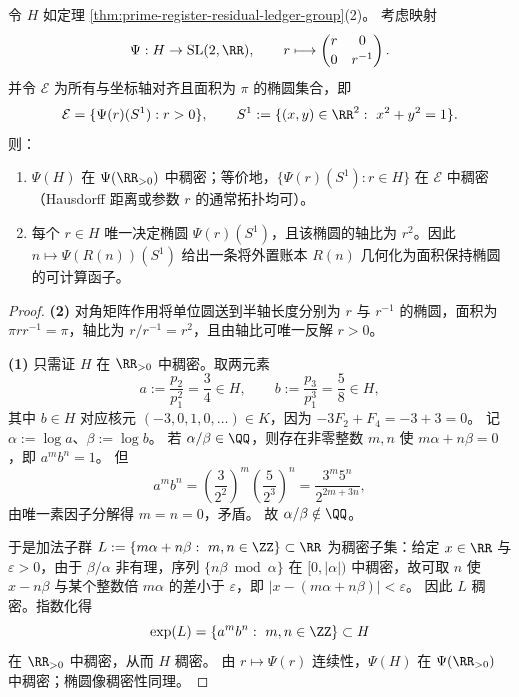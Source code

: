 \begin{theorem}[值保持算法群的稠密椭圆化]\label{thm:prime-register-dense-ellipticization}
令 \(H\) 如定理 \ref{thm:prime-register-residual-ledger-group}(2)。
考虑映射
\[
\Psi: H\to \mathrm{SL}(2,\RR),\qquad r\longmapsto
\begin{pmatrix}
r & 0\\[2pt]
0 & r^{-1}
\end{pmatrix}.
\]
并令 \(\mathcal E\) 为所有与坐标轴对齐且面积为 \(\pi\) 的椭圆集合，即
\[
\mathcal E=\{\Psi(r)(S^1): r>0\},
\qquad
S^1:=\{(x,y)\in\RR^2:\ x^2+y^2=1\}.
\]
则：
\begin{enumerate}
  \item \(\Psi(H)\) 在 \(\Psi(\RR_{>0})\) 中稠密；等价地，\(\{\Psi(r)(S^1):r\in H\}\) 在 \(\mathcal E\) 中稠密（Hausdorff 距离或参数 \(r\) 的通常拓扑均可）。
  \item 每个 \(r\in H\) 唯一决定椭圆 \(\Psi(r)(S^1)\)，且该椭圆的轴比为 \(r^2\)。因此 \(n\mapsto \Psi(R(n))(S^1)\) 给出一条将外置账本 \(R(n)\) 几何化为面积保持椭圆的可计算函子。
\end{enumerate}
\end{theorem}

\begin{proof}
\textbf{(2)} 对角矩阵作用将单位圆送到半轴长度分别为 \(r\) 与 \(r^{-1}\) 的椭圆，面积为 \(\pi rr^{-1}=\pi\)，轴比为 \(r/r^{-1}=r^2\)，且由轴比可唯一反解 \(r>0\)。

\textbf{(1)} 只需证 \(H\) 在 \(\RR_{>0}\) 中稠密。取两元素
\[
a:=\frac{p_2}{p_1^2}=\frac 34\in H,\qquad
b:=\frac{p_3}{p_1^3}=\frac 58\in H,
\]
其中 \(b\in H\) 对应核元 \((-3,0,1,0,\dots)\in K\)，因为 \(-3F_2+F_4=-3+3=0\)。
记 \(\alpha:=\log a\)、\(\beta:=\log b\)。
若 \(\alpha/\beta\in\QQ\)，则存在非零整数 \(m,n\) 使 \(m\alpha+n\beta=0\)，即 \(a^m b^n=1\)。
但
\[
a^m b^n
=\left(\frac{3}{2^2}\right)^m\left(\frac{5}{2^3}\right)^n
=\frac{3^m 5^n}{2^{2m+3n}},
\]
由唯一素因子分解得 \(m=n=0\)，矛盾。
故 \(\alpha/\beta\notin\QQ\)。

于是加法子群
\(
L:=\{m\alpha+n\beta:\ m,n\in\ZZ\}\subset\RR
\)
为稠密子集：给定 \(x\in\RR\) 与 \(\varepsilon>0\)，由于 \(\beta/\alpha\) 非有理，序列 \(\{n\beta\bmod \alpha\}\) 在 \([0,|\alpha|)\) 中稠密，故可取 \(n\) 使 \(x-n\beta\) 与某个整数倍 \(m\alpha\) 的差小于 \(\varepsilon\)，即 \(|x-(m\alpha+n\beta)|<\varepsilon\)。
因此 \(L\) 稠密。指数化得
\[
\exp(L)=\{a^m b^n:\ m,n\in\ZZ\}\subset H
\]
在 \(\RR_{>0}\) 中稠密，从而 \(H\) 稠密。
由 \(r\mapsto \Psi(r)\) 连续性，\(\Psi(H)\) 在 \(\Psi(\RR_{>0})\) 中稠密；椭圆像稠密性同理。
\end{proof}

